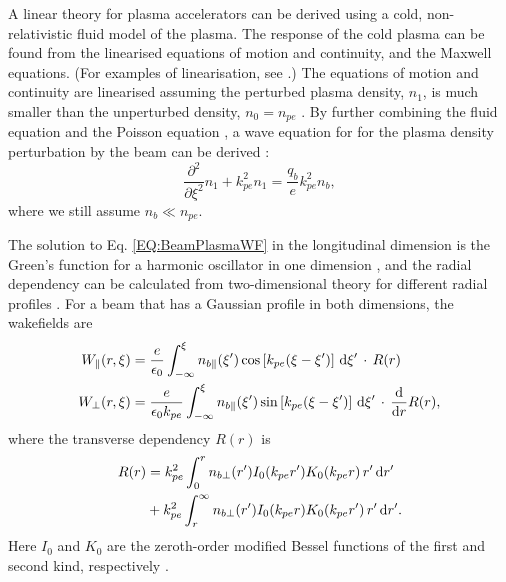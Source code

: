 A linear theory for plasma accelerators can be derived using a cold, non-relativistic fluid model of the plasma. The response of the cold plasma can be found from the linearised equations of motion and continuity, and the Maxwell equations. (For examples of linearisation, see \cite{pecseli:2012,chen:1974}.) The equations of motion and continuity are linearised assuming the perturbed plasma density, $n_{1}$, is much smaller than the unperturbed density, $n_{0} = n_{pe}$ \cite{chen:1987}. By further combining the fluid equation and the Poisson equation \cite{katsouleas:1987}, a wave equation for for the plasma density perturbation by the beam can be derived \cite{chen:1987,muggli:2017}:
\begin{equation}
    \frac{\partial^{2}}{\partial\xi^{2}}n_{1} + k_{pe}^{2}n_{1} = \frac{q_{b}}{e}k_{pe}^{2}n_{b}, \label{EQ:BeamPlasmaWF}
\end{equation}
where we still assume $n_{b} \ll n_{pe}$.

The solution to Eq. \ref{EQ:BeamPlasmaWF} in the longitudinal dimension is the Green’s function for a harmonic oscillator in one dimension \cite{katsouleas:1987}, and the radial dependency can be calculated from two-dimensional theory for different radial profiles \cite{chen:1987}. For a beam that has a Gaussian profile in both dimensions, the wakefields are
\begin{align}
    W_{\parallel}(r,\xi) &= \frac{e}{\epsilon_{0}}
        \int_{-\infty}^{\xi} n_{b\parallel}(\xi^{\prime}) \cos\left[k_{pe}(\xi-\xi^{\prime})\right] \,\mathrm{d}\xi^{\prime} \,\cdot\, R(r) \label{EQ:WzFull} \\
    W_{\perp}(r,\xi) &= \frac{e}{\epsilon_{0}k_{pe}}
        \int_{-\infty}^{\xi} n_{b\parallel}(\xi^{\prime}) \sin\left[k_{pe}(\xi-\xi^{\prime})\right] \,\mathrm{d}\xi^{\prime} \,\cdot\, \frac{\mathrm{d}}{\mathrm{d}r}R(r), \label{EQ:WrFull}
\end{align}
where the transverse dependency $R(r)$ is
\begin{align}
    R(r) &= k_{pe}^{2} \int_{0}^{r} n_{b\perp}(r^{\prime}) I_{0}(k_{pe}r^{\prime})
           K_{0}(k_{pe}r) \,r^{\prime}\,\mathrm{d} r^{\prime} \nonumber \\
         &+ k_{pe}^{2} \int_{r}^{\infty} n_{b\perp}(r^{\prime}) I_{0}(k_{pe}r)
           K_{0}(k_{pe}r^{\prime}) \,r^{\prime}\,\mathrm{d} r^{\prime}. \label{EQ:WFRadial}
\end{align}
Here $I_{0}$ and $K_{0}$ are the zeroth-order modified Bessel functions of the first and second kind, respectively \cite{chen:1987,muggli:2017}.


